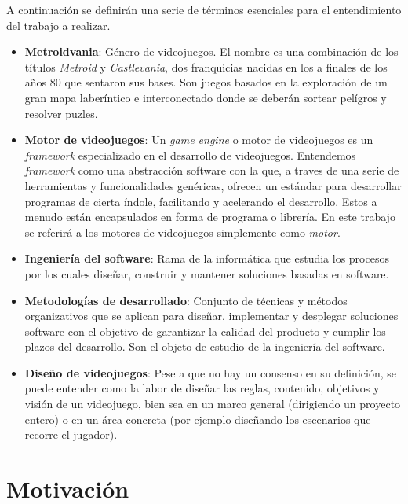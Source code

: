 A continuación se definirán una serie de términos esenciales para el entendimiento del trabajo a realizar.

\begin{itemize}
    \item \textbf{Metroidvania}: Género de videojuegos. El nombre es una combinación de los títulos \textit{Metroid} y \textit{Castlevania}, dos franquicias nacidas en los a finales de los años 80 que sentaron sus bases. Son juegos basados en la exploración de un gran mapa laberíntico e interconectado donde se deberán sortear pelígros y resolver puzles.

    \item \textbf{Motor de videojuegos}: Un \textit{game engine} o motor de videojuegos es un \textit{framework} especializado en el desarrollo de videojuegos. Entendemos \textit{framework} como una abstracción software con la que, a traves de una serie de herramientas y funcionalidades genéricas, ofrecen un estándar para desarrollar programas de cierta índole, facilitando y acelerando el desarrollo. Estos a menudo están encapsulados en forma de programa o librería. En este trabajo se referirá a los motores de videojuegos simplemente como \textit{motor}.
    
    \item \textbf{Ingeniería del software}: Rama de la informática que estudia los procesos por los cuales diseñar, construir y mantener soluciones basadas en software.

    \item \textbf{Metodologías de desarrollado}: Conjunto de técnicas y métodos organizativos que se aplican para diseñar, implementar y desplegar soluciones software con el objetivo de garantizar la calidad del producto y cumplir los plazos del desarrollo. Son el objeto de estudio de la ingeniería del software.
    
    \item \textbf{Diseño de videojuegos}: Pese a que no hay un consenso en su definición, se puede entender como la labor de diseñar las reglas, contenido, objetivos y visión de un videojuego, bien sea en un marco general (dirigiendo un proyecto entero) o en un área concreta (por ejemplo diseñando los escenarios que recorre el jugador).

\end{itemize} 

\section{Motivación}

